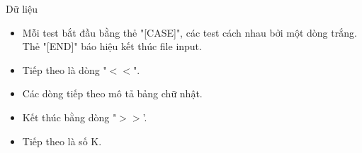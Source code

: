 Dữ liệu  
\begin{itemize}
	\item     Mỗi test bắt đầu bằng thẻ "[CASE]", các test cách nhau bởi một dòng trắng. Thẻ "[END]" báo hiệu kết thúc file input.   
	\item     Tiếp theo là dòng "$<$$<$".   
	\item     Các dòng tiếp theo mô tả bảng chữ nhật.   
	\item     Kết thúc bằng dòng "$>$$>$'.   
	\item     Tiếp theo là số K.   
\end{itemize}
